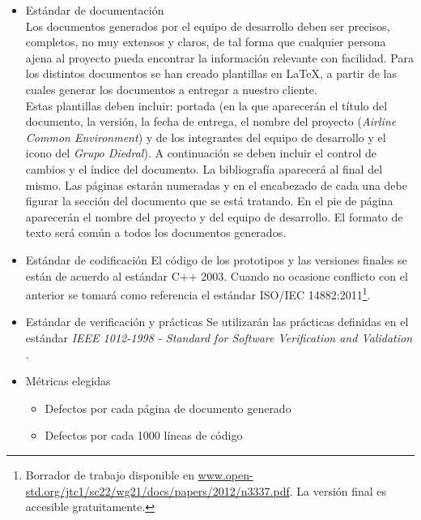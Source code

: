 \documentclass[11pt, a4paper, twoside, titlepage]{article}
\begin{document}
			\begin{itemize}
				\item Estándar de documentación\\
					Los documentos generados por el equipo de desarrollo deben ser precisos, completos, no muy extensos y claros, de tal forma que cualquier persona ajena al proyecto pueda encontrar la información relevante con facilidad. %
Para los distintos documentos se han creado plantillas en {\rmfamily\LaTeX{}}, a partir de las cuales generar los documentos a entregar a nuestro cliente.\\

					Estas plantillas deben incluir: portada (en la que aparecerán el título del documento, la versión, la fecha de entrega, el nombre del proyecto (\textit{Airline Common Environment}) y de los integrantes del equipo de desarrollo y el icono del \textit{Grupo Diedral}). A continuación se deben incluir el control de cambios y el índice del documento. La bibliografía aparecerá al final del mismo. Las páginas estarán numeradas y en el encabezado de cada una debe figurar la sección del documento que se está tratando. En el pie de página aparecerán el nombre del proyecto y del equipo de desarrollo. El formato de texto será común a todos los documentos generados.

				\item Estándar de  codificación %
					El código de los prototipos y las versiones finales se están de acuerdo al estándar C++ 2003. Cuando no ocasione conflicto con el anterior se tomará como referencia el estándar ISO/IEC 14882:2011\footnote{Borrador de trabajo disponible en \url{www.open-std.org/jtc1/sc22/wg21/docs/papers/2012/n3337.pdf}. La versión final es accesible gratuitamente.}.
					
				\item Estándar de verificación y prácticas
					Se utilizarán las prácticas definidas en el estándar \textit{IEEE 1012-1998 - Standard for Software Verification and Validation} \cite{IEEE1012-1998}.

				\item Métricas elegidas
					\begin{itemize}
						\item Defectos por cada página de documento generado
						\item Defectos por cada 1000 líneas de código
					\end{itemize}
			\end{itemize}
\end{document}

